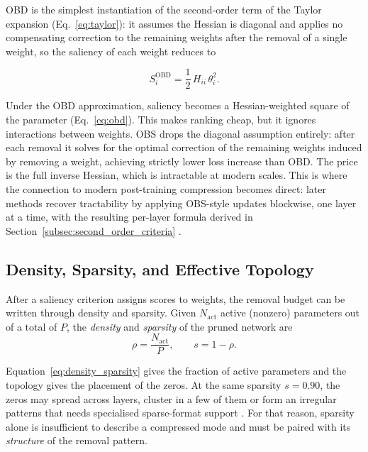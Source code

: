OBD \cite{lecun1989optimal} is the simplest instantiation of the second-order
term of the Taylor expansion (Eq.~\eqref{eq:taylor}): it assumes the Hessian is diagonal and applies no compensating correction to the remaining weights after the removal of a single weight,
so the saliency of each weight reduces to

\begin{equation}
	S_i^{\mathrm{OBD}} = \frac{1}{2}\, H_{ii}\,\theta_i^2.
	\label{eq:obd}
\end{equation}

Under the OBD approximation, saliency becomes a Hessian-weighted square of the parameter (Eq.~\eqref{eq:obd}). This makes ranking cheap, but it ignores interactions between
weights. OBS \cite{hassibi1993second} drops the diagonal assumption
entirely: after each removal it solves for the optimal correction of the remaining weights
induced by removing a weight, achieving strictly lower loss increase than OBD. The price is the full
inverse Hessian, which is intractable at modern scales. This is where the
connection to modern post-training compression becomes direct: later methods recover
tractability by applying OBS-style updates blockwise, one layer at a time,
with the resulting per-layer formula derived in Section~\ref{subsec:second_order_criteria}
\cite{frantar2023sparsegpt,frantar2022gptq}.

\subsection{Density, Sparsity, and Effective Topology}
\label{subsec:density_sparsity_topology}

After a saliency criterion assigns scores to weights, the removal budget can be
written through density and sparsity. Given $N_\mathrm{act}$ active (nonzero)
parameters out of a total of $P$, the \emph{density} and \emph{sparsity} of the
pruned network are
\begin{equation}
	\rho = \frac{N_\mathrm{act}}{P}, \qquad s = 1 - \rho.
	\label{eq:density_sparsity}
\end{equation}

Equation~\eqref{eq:density_sparsity} gives the fraction of active parameters and the topology gives the placement of the zeros. At the same sparsity $s = 0.90$, the zeros may spread across layers, cluster in a few of them or form an irregular
patterns that needs specialised sparse-format support \cite{hoefler2021sparsity}.
For that reason, sparsity alone is insufficient to describe a compressed mode and must be paired with its \emph{structure} of the removal pattern.


